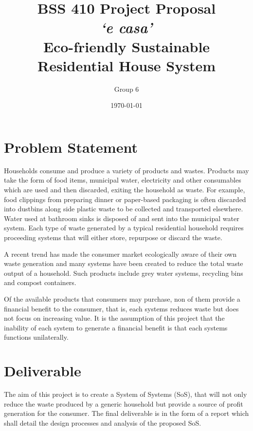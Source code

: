 \documentclass{article}
\begin{document}
\title{\vspace{-5em} BSS 410 Project Proposal\\\textit{`e casa'}\\ Eco-friendly Sustainable Residential House System} %
\author{Group 6}
\date{\today}
\maketitle

\section{Problem Statement}
  Households consume and produce a variety of products and wastes. Products may take the form of food items, municipal water, electricity and other consumables which are used and then discarded, exiting the household as waste. For example, food clippings from preparing dinner or paper-based packaging is often discarded into dustbins along side plastic waste to be collected and transported elsewhere. Water used at bathroom sinks is disposed of and sent into the municipal water system. Each type of waste generated by a typical residential household requires proceeding systems that will either store, repurpose or discard the waste.
  
  A recent trend has made the consumer market ecologically aware of their own waste generation and many systems have been created to reduce the total waste output of a household. Such products include grey water systems, recycling bins and compost containers. 
  
  Of the available products that consumers may purchase, non of them provide a financial benefit to the consumer, that is, each systems reduces waste but does not focus on increasing value. It is the assumption of this project that the inability of each system to generate a financial benefit is that each systems functions unilaterally.
    
\section{Deliverable}
The aim of this project is to create a System of Systems (SoS), that will not only reduce the waste produced by a generic household but provide a source of profit generation for the consumer. The final deliverable is in the form of a report which shall detail the design processes and analysis of the proposed SoS.
\end{document}
